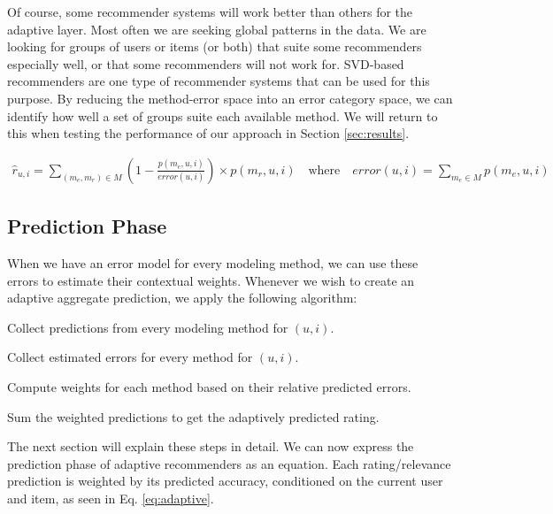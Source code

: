 Of course, some recommender systems will work better than others for the adaptive layer.
Most often we are seeking global patterns in the data.
We are looking for groups of users or items (or both) that suite some 
recommenders especially well, or that some recommenders will not work for.
SVD-based recommenders are one type of recommender systems that can be used for this purpose.
By reducing the method-error space into an error category space,
we can identify how well a set of groups suite each available method.
We will return to this when testing the performance
of our approach in Section \ref{sec:results}.


\begin{figure*}[!t]
\normalsize
\begin{eqnarray}
  \label{eq:adaptive}
  \hat{r}_{u,i} = \sum_{(m_{e}, m_{r}) \in M} (1 - 
  \frac{
    p(m_{e},u,i)
  }{
    error(u,i)
  }) \times p(m_{r},u,i)
  \quad
  \text{where}
  \quad
  error(u,i) = \sum_{m_e \in M} p(m_e,u,i) 
\end{eqnarray}
\hrulefill
\vspace*{4pt}
\end{figure*}

\subsection{Prediction Phase}

When we have an error model for every modeling method, 
we can use these errors to estimate their contextual weights.
Whenever we wish to create an adaptive aggregate prediction,
we apply the following algorithm:

\begin{enumerate*}
  \item Collect predictions from every modeling method for $(u,i)$.
  \item Collect estimated errors for every method for $(u,i)$.
  \item Compute weights for each method based on their relative predicted errors.
  \item Sum the weighted predictions to get the adaptively predicted rating.
\end{enumerate*}

The next section will explain these steps in detail.
We can now express the prediction phase of adaptive recommenders as an equation.
Each rating/relevance prediction is weighted by its predicted accuracy,
conditioned on the current user and item,
as seen in Eq. \ref{eq:adaptive}.

